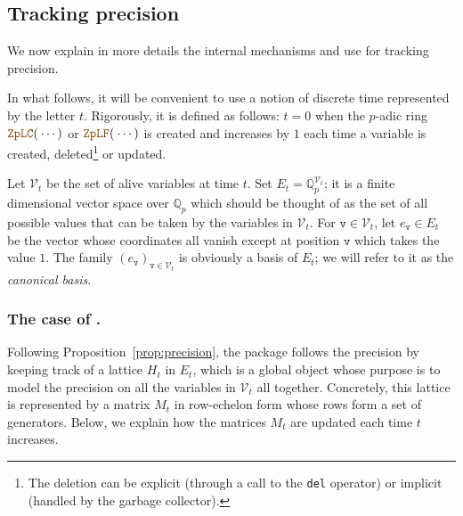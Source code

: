 \documentclass[sigconf]{acmart}
\newcommand{\Z}{\mathbb Z}
\newcommand{\Zp}{\Z_p}
\newcommand{\Q}{\mathbb Q}
\newcommand{\Qp}{\Q_p}
\newcommand{\calV}{\mathcal{V}}
\newcommand{\ttv}{\texttt{v}\xspace}
\newcommand{\ZpLC}{\text{\color{output} \rm \tt ZpLC}\xspace}
\newcommand{\ZpLF}{\text{\color{output} \rm \tt ZpLF}\xspace}
\newtheorem{prop}[theo]{Proposition}
\theoremstyle{definition}
\begin{document}
%

\subsection{Tracking precision}
\label{ssec:trackprec}

We now explain in more details the internal mechanisms \ZpLC and \ZpLF 
use for tracking precision. 

In what follows, it will be convenient to use a notion of discrete time 
represented by the letter $t$. Rigorously, it is defined as follows: 
$t=0$ when the $p$-adic ring $\ZpLC(\:\cdots)$ or $\ZpLF(\:\cdots)$ is 
created and increases by $1$ each time a variable is created, 
deleted\footnote{The deletion can be explicit (through a call to the 
\texttt{del} operator) or implicit (handled by the garbage collector).} 
or updated.

Let $\calV_t$ be the set of alive variables at time $t$. Set $E_t = 
\Qp^{\calV_t}$; it is a finite dimensional vector space over $\Qp$ which 
should be thought of as the set of all possible values that can be taken by 
the variables in $\calV_t$. For $\ttv \in \calV_t$, let $e_\ttv \in
E_t$ be the vector whose coordinates all vanish except 
at position $\ttv$ which takes the value $1$. The family 
$(e_\ttv)_{\ttv \in \calV_t}$ is obviously a basis of $E_t$; we will 
refer to it as the \emph{canonical basis}.

\subsubsection{The case of \ZpLC.}

Following Proposition~\ref{prop:precision},
the package \ZpLC follows the precision by keeping track of a lattice
$H_t$ in $E_t$, which is a global object whose purpose is to model the 
precision on all the variables in $\calV_t$ all together.
Concretely, this lattice is represented by a matrix $M_t$ in row-echelon 
form whose rows form a set of generators.
Below, we explain how the matrices $M_t$ are updated each time
$t$ increases.
\end{document}
